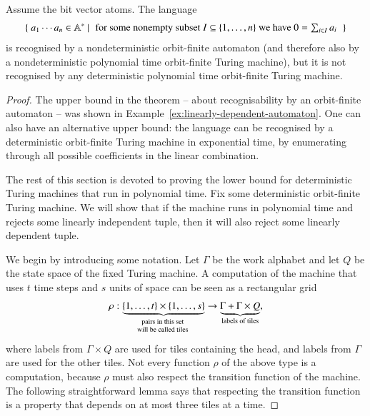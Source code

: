\begin{theorem}\label{thm:bit-vector-p-np}
	Assume the bit vector atoms. The language
	\begin{align*}
		\setbuild{ a_1 \cdots a_n \in \atoms^*}{for some nonempty subset $I \subseteq \set{1,\ldots,n}$ we have $0=\sum_{i \in I}a_i$} 
	\end{align*}
	is recognised by a nondeterministic orbit-finite automaton (and therefore also by a nondeterministic polynomial time orbit-finite Turing machine), but it is not recognised by any deterministic polynomial time orbit-finite Turing machine.
\end{theorem}
\begin{proof}
The upper bound in the  theorem -- about recognisability by an orbit-finite automaton -- was shown in Example~\ref{ex:linearly-dependent-automaton}. One can also have an alternative upper bound: the language can be recognised by a deterministic orbit-finite Turing machine in exponential time, by enumerating through all possible coefficients in the linear combination. 

The rest of this section is devoted to proving the lower bound for deterministic Turing machines that run in polynomial time. 	
Fix some deterministic orbit-finite Turing machine.  We will show that if the machine runs in polynomial time and rejects some linearly independent tuple, then it will also reject some linearly dependent tuple. 

	We begin by introducing some notation. 
	Let $\Gamma$ be the work alphabet and let $Q$ be the state space of the fixed Turing machine. A computation of the machine that uses $t$ time steps and $s$ units of space can be seen as a rectangular grid \begin{align*}
	\rho : \myunderbrace{\set{1,\ldots,t} \times \set{1,\ldots,s}}{pairs in this set\\ will be called tiles} \to 	\underbrace{\Gamma + \Gamma \times Q}_{\text{labels of tiles}},
	\end{align*}
	where
 labels from $\Gamma \times Q$ are used for tiles containing the head, and labels from $\Gamma$ are used for the other tiles. Not every function $\rho$ of the above type is a computation, because $\rho$ must also respect the transition function of the machine. The following straightforward lemma says that respecting the transition function is a property that depends on at most three tiles at a time. 



\end{proof}
